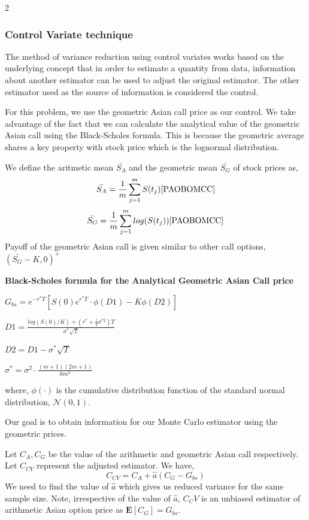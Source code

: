 \begin{multicols}{2}
\subsubsection{Control Variate technique\cite{AOPMCCV}}
\label{subsec: 3.2.3}

The method of variance reduction using control variates works based on the underlying concept that in order to estimate a quantity from data, information about another estimator can be used to adjust the original estimator. The other estimator used as the source of information is considered the control.

For this problem, we use the geometric Asian call price as our control. We take advantage of the fact that we can calculate the analytical value of the geometric Asian call using the Black-Scholes formula. This is because the geometric average shares a key property with stock price which is the lognormal distribution.\cite{PAOBOMCC}

We define the aritmetic mean $\bar{S_A}$ and the geometric mean $\bar{S_G}$ of stock prices as,
$$
    \bar{S_A} = \frac{1}{m} \sum_{j=1}^m S(t_j)\cite{PAOBOMCC}
$$
$$
    \bar{S_G} = \frac{1}{m} \sum_{j=1}^m log(S(t_j))\cite{PAOBOMCC}
$$
Payoff of the geometric Asian call is given similar to other call options, $(\bar{S_G} - K, 0)^+$

\textbf{Black-Scholes formula for the Analytical Geometric Asian Call price}\cite{PAOBOMCC}

$G_{bs} = e^{-r^*T} \left[S(0)e^{r^*T}\cdot\phi(D1)-K\phi(D2)\right]$\cite{TBSM}

$D1 = \frac{log(S(0)/K) + (r^* + \frac{1}{2}\sigma^{*2})T}{\sigma^*\sqrt{T}}$\cite{TBSM}

$D2 = D1 - \sigma^*\sqrt{T}$\cite{TBSM}

$\sigma^* = \sigma^2 \cdot \frac{(m+1)(2m+1)}{6m^2}$\cite{TBSM}

where, $\phi(\cdot)$ is the cumulative distribution function of the standard normal distribution, $\mathcal{N}(0,1)$.

Our goal is to obtain information for our Monte Carlo estimator using the geometric prices. 

Let $C_A, C_G$ be the value of the arithmetic and geometric Asian call respectively. Let $C_{CV}$ represent the adjusted estimator. We have,
$$
    C_{CV} = C_A + \hat{a}(C_G - G_{bs})
$$
We need to find the value of $\hat{a}$ which gives us reduced variance for the same sample size. Note, irrespective of the value of $\hat{a}$, $C_CV$ is an unbiased estimator of arithmetic Asian option price as $\mathbf{E}[C_G] = G_{bs}$.


\end{multicols}
